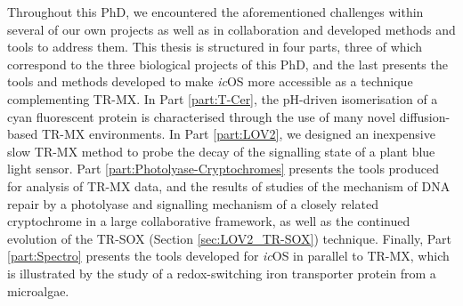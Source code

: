 Throughout this PhD, we encountered the aforementioned challenges within several of our own projects as well as in collaboration and developed methods and tools to address them. This thesis is structured in four parts, three of which correspond to the three biological projects of this PhD, and the last presents the tools and methods developed to make \textit{ic}OS more accessible as a technique complementing TR-MX. In Part \ref{part:T-Cer}, the pH-driven isomerisation of a cyan fluorescent protein is characterised through the use of many novel diffusion-based TR-MX environments. In Part \ref{part:LOV2}, we designed an inexpensive slow TR-MX method to probe the decay of the signalling state of a plant blue light sensor. Part \ref{part:Photolyase-Cryptochromes} presents the tools produced for analysis of TR-MX data, and the results of studies of the mechanism of DNA repair by a photolyase and signalling mechanism of a closely related cryptochrome in a large collaborative framework, as well as the continued evolution of the TR-SOX (Section \ref{sec:LOV2_TR-SOX}) technique. Finally, Part \ref{part:Spectro} presents the tools developed for \textit{ic}OS in parallel to TR-MX, which is illustrated by the study of a redox-switching iron transporter protein from a microalgae.



